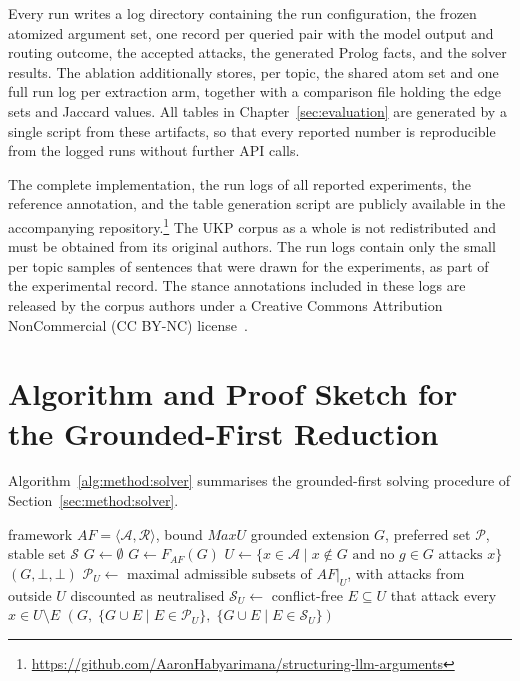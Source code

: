 Every run writes a log directory containing the run configuration, the frozen
atomized argument set, one record per queried pair with the model output and
routing outcome, the accepted attacks, the generated Prolog facts, and the
solver results. The ablation additionally stores, per topic, the shared atom
set and one full run log per extraction arm, together with a comparison file
holding the edge sets and Jaccard values. All tables in
Chapter~\ref{sec:evaluation} are generated by a single script from these
artifacts, so that every reported number is reproducible from the logged runs
without further API calls.

The complete implementation, the run logs of all reported experiments, the
reference annotation, and the table generation script are publicly available
in the accompanying repository.\footnote{\url{https://github.com/AaronHabyarimana/structuring-llm-arguments}}
The UKP corpus as a whole is not redistributed and must be
obtained from its original authors. The run logs contain only the small
per topic samples of sentences that were drawn for the experiments, as part
of the experimental record. The stance annotations included in these logs
are released by the corpus authors under a Creative Commons Attribution
NonCommercial (CC BY-NC) license~\cite{stab2018}.

\section{Algorithm and Proof Sketch for the Grounded-First Reduction}
\label{sec:appendix:proof}

Algorithm~\ref{alg:method:solver} summarises the grounded-first solving
procedure of Section~\ref{sec:method:solver}.

\begin{algorithm}[tb]
\caption{Grounded-first solving with undecided-core guard}
\label{alg:method:solver}
\begin{algorithmic}[1]
\Require framework $AF = \langle \mathcal{A}, \mathcal{R} \rangle$,
  bound $\mathit{MaxU}$
\Ensure grounded extension $G$, preferred set $\mathcal{P}$,
  stable set $\mathcal{S}$
\State $G \gets \emptyset$
\Repeat {}
  \State $G \gets F_{AF}(G)$
\State $U \gets \{x \in \mathcal{A} \mid x \notin G \text{ and no }
  g \in G \text{ attacks } x\}$
  \State \Return $(G, \bot, \bot)$
\EndIf
\State $\mathcal{P}_U \gets$ maximal admissible subsets of $AF|_U$, with
  attacks from outside $U$ discounted as neutralised
\State $\mathcal{S}_U \gets$ conflict-free $E \subseteq U$ that attack every
  $x \in U \setminus E$
\State \Return $(G,\; \{G \cup E \mid E \in \mathcal{P}_U\},\;
  \{G \cup E \mid E \in \mathcal{S}_U\})$
\end{algorithmic}
\end{algorithm}

